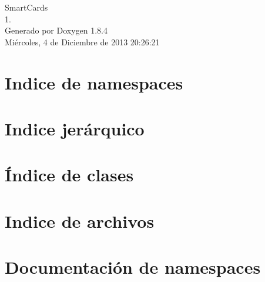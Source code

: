 \documentclass[twoside]{book}
\newcommand{\clearemptydoublepage}{%
  \newpage{\pagestyle{empty}\cleardoublepage}%
}
\begin{document}
\hypersetup{pageanchor=false}
\begin{titlepage}
\vspace*{7cm}
\begin{center}%
{\Large Smart\-Cards \\[1ex]\large 1. }\\
\vspace*{1cm}
{\large Generado por Doxygen 1.8.4}\\
\vspace*{0.5cm}
{\small Miércoles, 4 de Diciembre de 2013 20:26:21}\\
\end{center}
\end{titlepage}
\clearemptydoublepage
\tableofcontents
\clearemptydoublepage
{}
\hypersetup{pageanchor=true}

\chapter{Indice de namespaces}

\chapter{Indice jerárquico}

\chapter{Índice de clases}

\chapter{Indice de archivos}

\chapter{Documentación de namespaces}








\end{document}
